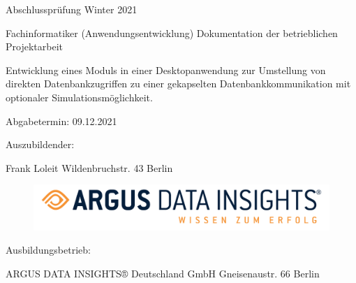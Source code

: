 \documentclass[11pt,toc=sectionentrywithoutdots, 
headheight=44pt, headings=optiontoheadandtoc, hyperfootnotes=false, hypertexnames=false]{scrartcl}
\begin{document}
\begin{center}
\begin{Large}

Abschlussprüfung Winter 2021
\linebreak

Fachinformatiker (Anwendungsentwicklung)\linebreak
Dokumentation der betrieblichen Projektarbeit
\linebreak\linebreak
\end{Large}


\begin{LARGE}
\begin{bfseries}
	Entwicklung eines Moduls in einer Desktopanwendung zur Umstellung von direkten Datenbankzugriffen zu einer gekapselten Datenbankkommunikation mit optionaler Simulationsmöglichkeit.
\linebreak\linebreak
\end{bfseries}
\end{LARGE}

\begin{Large}

Abgabetermin: 09.12.2021
\linebreak\linebreak
\begin{bfseries}
Auszubildender:\linebreak
\end{bfseries}
Frank Loleit\linebreak
Wildenbruchstr. 43 Berlin\linebreak

\begin{figure}[h]
\includegraphics[scale=0.25]{argusLogo}
\centering
\end{figure}



\begin{bfseries}
Ausbildungsbetrieb:\linebreak
\end{bfseries}
ARGUS DATA INSIGHTS® Deutschland GmbH\linebreak
Gneisenaustr. 66 Berlin


\end{Large}


\end{center}
\newpage
\setcounter{page}{1}
\end{document}
